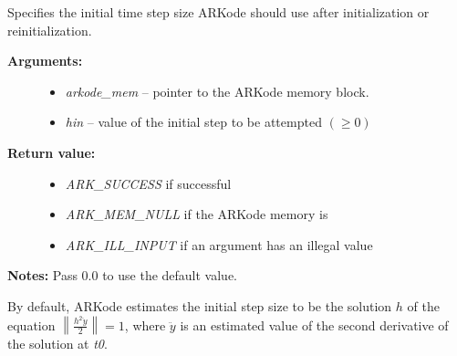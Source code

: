 \documentclass[letterpaper,10pt,english]{sphinxmanual}
\begin{document}
\begin{fulllineitems}
\label{c_interface/User_callable:ARKodeSetInitStep}
Specifies the initial time step size ARKode should use after
initialization or reinitialization.
\begin{description}
\item[{\textbf{Arguments:}}] \leavevmode\begin{itemize}
\item {} 
\emph{arkode\_mem} -- pointer to the ARKode memory block.

\item {} 
\emph{hin} -- value of the initial step to be attempted $(\ge 0)$

\end{itemize}

\item[{\textbf{Return value:}}] \leavevmode\begin{itemize}
\item {} 
\emph{ARK\_SUCCESS} if successful

\item {} 
\emph{ARK\_MEM\_NULL} if the ARKode memory is 

\item {} 
\emph{ARK\_ILL\_INPUT} if an argument has an illegal value

\end{itemize}

\end{description}

\textbf{Notes:} Pass 0.0 to use the default value.

By default, ARKode estimates the initial step size to be the
solution $h$ of the equation $\left\| \frac{h^2
\ddot{y}}{2}\right\| = 1$, where $\ddot{y}$ is an estimated
value of the second derivative of the solution at \emph{t0}.

\end{fulllineitems}

\end{document}
